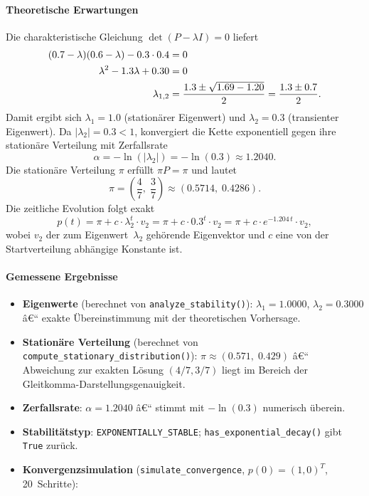 ﻿\documentclass[a4paper,12pt]{scrreprt}
\theoremstyle{definition}
\begin{document}
\paragraph{Theoretische Erwartungen}

Die charakteristische Gleichung $\det(P - \lambda I) = 0$ liefert
\begin{align}
	(0.7 - \lambda)(0.6 - \lambda) - 0.3 \cdot 0.4 &= 0 \notag \\
	\lambda^2 - 1.3\lambda + 0.30 &= 0 \notag \\
	\lambda_{1,2} &= \frac{1.3 \pm \sqrt{1.69 - 1.20}}{2}
	= \frac{1.3 \pm 0.7}{2}.
\end{align}
Damit ergibt sich $\lambda_1 = 1.0$ (stationärer Eigenwert) und
$\lambda_2 = 0.3$ (transienter Eigenwert).  Da $|\lambda_2| = 0.3 < 1$,
konvergiert die Kette exponentiell gegen ihre stationäre Verteilung mit
Zerfallsrate
\[
\alpha = -\ln(|\lambda_2|) = -\ln(0.3) \approx 1.2040.
\]
Die stationäre Verteilung $\pi$ erfüllt $\pi P = \pi$ und lautet
\[
\pi = \left(\frac{4}{7},\; \frac{3}{7}\right) \approx (0.5714,\; 0.4286).
\]
Die zeitliche Evolution folgt exakt
\begin{equation}
	p(t) = \pi + c \cdot \lambda_2^t \cdot v_2
	= \pi + c \cdot 0.3^t \cdot v_2
	= \pi + c \cdot e^{-1.204\,t} \cdot v_2,
	\label{eq:konvergenz}
\end{equation}
wobei $v_2$ der zum Eigenwert~$\lambda_2$ gehörende Eigenvektor und
$c$ eine von der Startverteilung abhängige Konstante ist.

\paragraph{Gemessene Ergebnisse}

\begin{itemize}
	\item \textbf{Eigenwerte} (berechnet von \texttt{analyze\_stability()}):
	$\lambda_1 = 1.0000$, $\lambda_2 = 0.3000$ â€“ exakte
	Übereinstimmung mit der theoretischen Vorhersage.
	
	\item \textbf{Stationäre Verteilung} (berechnet von
	\texttt{compute\_stationary\_distribu\newline tion()}):
	$\pi \approx (0.571,\; 0.429)$ â€“ Abweichung zur exakten
	Lösung $(4/7, 3/7)$ liegt im Bereich der
	Gleitkomma-Darstellungsgenauigkeit.
	
	\item \textbf{Zerfallsrate}: $\alpha = 1.2040$ â€“ stimmt mit
	$-\ln(0.3)$ numerisch überein.
	
	\item \textbf{Stabilitätstyp}: \texttt{EXPONENTIALLY\_STABLE};
	\texttt{has\_exponential\_decay()} gibt \texttt{True}
	zurück.
	
	\item \textbf{Konvergenzsimulation} (\texttt{simulate\_convergence},
	$p(0) = (1, 0)^T$, 20~Schritte):
\end{itemize}
\end{document}
